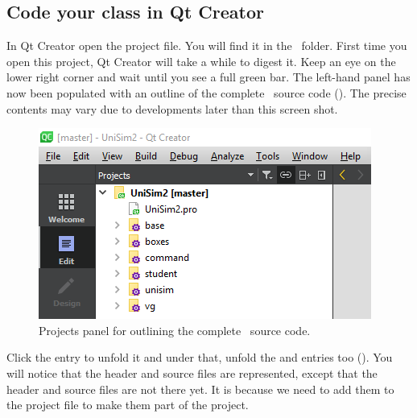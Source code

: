 \subsection {Code your class in Qt Creator}
In Qt Creator open the  project file. You will find it in the \devhome\ folder. First time you open this project, Qt Creator will take a while to digest it. Keep an eye on the lower right corner and wait until you see a full green bar.
The left-hand panel has now been populated with an outline of the complete \US\ source code (). The precise contents may vary due to developments later than this screen shot.

\begin{figure}
\centering
\includegraphics[scale=0.7]{graphics/qt-creator-projects}
\caption{Projects panel for  outlining the complete \US\ source code.}
\label{fig:qt-creator-projects}
\end{figure}

Click the  entry to unfold it and under that, unfold the  and  entries too (). You will notice that the header and source files are represented, except that the  header and source files are not there yet. It is because we need to add them to the  project file to make them part of the project.

